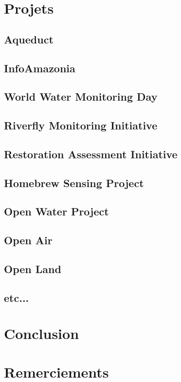 \documentclass[10pt, conference, compsocconf]{llncs}
\begin{document}
\section{Projets}
	\subsection{Aqueduct}
	\subsection{InfoAmazonia}
	\subsection{World Water Monitoring Day}
	\subsection{Riverfly Monitoring Initiative}
	\subsection{Restoration Assessment Initiative}
	\subsection{Homebrew Sensing Project}
	\subsection{Open Water Project}
	\subsection{Open Air}
	\subsection{Open Land}
	\subsection{etc...}

\section{Conclusion}\label{sec:conclusion}

\section*{Remerciements}





\end{document}

